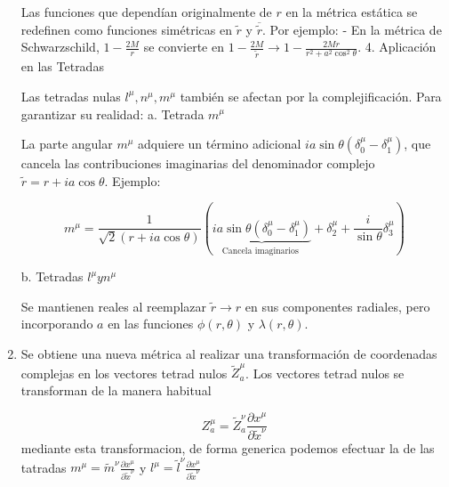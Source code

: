 \begin{enumerate}[1]
Las funciones que dependían originalmente de $r$ en la métrica estática se redefinen como funciones simétricas en $\tilde{r}$ y $\overline{\tilde{r}}$. Por ejemplo:
- En la métrica de Schwarzschild, $1-\frac{2 M}{r}$ se convierte en $1-\frac{2 M}{\tilde{r}} \rightarrow 1-\frac{2 M r}{r^2+a^2 \cos ^2 \theta}$.
4. Aplicación en las Tetradas

Las tetradas nulas $l^\mu, n^\mu, m^\mu$ también se afectan por la complejificación. Para garantizar su realidad:
a. Tetrada $m^\mu$

La parte angular $m^\mu$ adquiere un término adicional $i a \sin \theta\left(\delta_0^\mu-\delta_1^\mu\right)$, que cancela las contribuciones imaginarias del denominador complejo $\tilde{r}=r+i a \cos \theta$.
Ejemplo:

$$
m^\mu=\frac{1}{\sqrt{2}(r+i a \cos \theta)}(\underbrace{i a \sin \theta\left(\delta_0^\mu-\delta_1^\mu\right)}_{\text {Cancela imaginarios }}+\delta_2^\mu+\frac{i}{\sin \theta} \delta_3^\mu)
$$

b. Tetradas $l^\mu y n^\mu$

Se mantienen reales al reemplazar $\tilde{r} \rightarrow r$ en sus componentes radiales, pero incorporando $a$ en las funciones $\phi(r, \theta)$ y $\lambda(r, \theta)$.


    \item Se obtiene una nueva métrica al realizar una transformación de coordenadas complejas en los vectores tetrad nulos $\tilde{Z}_a^\mu$. Los vectores tetrad nulos se transforman de la manera habitual


          \begin{equation}
              Z_a^\mu=\tilde{Z}_a^\nu \frac{\partial x^\mu}{\partial \tilde{x}^\nu}
          \end{equation}
          mediante esta transformacion, de forma generica podemos efectuar la de las tatradas $m^\mu=\tilde{m}^\nu \frac{\partial x^\mu}{\partial \tilde{x}^\nu}$ y $l^\mu=\tilde{l}^\nu \frac{\partial x^\mu}{\partial \tilde{x}^\nu}$


\end{enumerate}
